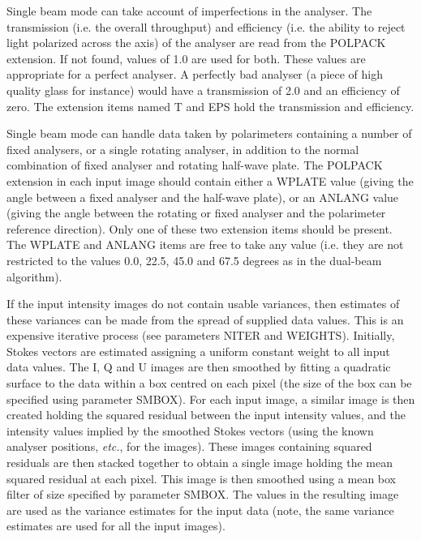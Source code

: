 \documentclass[twoside,11pt]{article}
\renewcommand{\_}{\texttt{\symbol{95}}}
\begin{document}
{{      Single beam mode can take account of imperfections in the analyser.
      The transmission (i.e. the overall throughput) and efficiency
      (i.e. the ability to reject light polarized across the axis) of the
      analyser are read from the POLPACK extension. If not found, values
      of 1.0 are used for both. These values are appropriate for a
      perfect analyser. A perfectly bad analyser (a piece of high quality
      glass for instance) would have a transmission of 2.0 and an
      efficiency of zero. The extension items named T and EPS hold the
      transmission and efficiency.

      Single beam mode can handle data taken by polarimeters containing
      a number of fixed analysers, or a single rotating analyser, in
      addition to the normal combination of fixed analyser and rotating
      half-wave plate. The POLPACK extension in each input image should
      contain either a WPLATE value (giving the angle between a fixed
      analyser and the half-wave plate), or an ANLANG value (giving the
      angle between the rotating or fixed analyser and the polarimeter
      reference direction). Only one of these two extension items
      should be present. The WPLATE and ANLANG items are free to take
      any value (i.e. they are not restricted to the values 0.0, 22.5,
      45.0 and 67.5 degrees as in the dual-beam algorithm).

      If the input intensity images do not contain usable variances,
      then estimates of these variances can be made from the spread of
      supplied data values. This is an expensive iterative process
      (see parameters NITER and WEIGHTS). Initially, Stokes vectors
      are estimated assigning a uniform constant weight to all input
      data values. The I, Q and U images are then smoothed by fitting
      a quadratic surface to the data within a box centred on each
      pixel (the size of the box can be specified using parameter
      SMBOX). For each input image, a similar image is then created
      holding the squared residual between the input intensity values,
      and the intensity values implied by the smoothed Stokes vectors
      (using the known analyser positions, \emph{etc.}, for the images). These
      images containing squared residuals are then stacked together
      to obtain a single image holding the mean squared residual at
      each pixel. This image is then smoothed using a mean box filter
      of size specified by parameter SMBOX. The values in the resulting
      image are used as the variance estimates for the input data (note,
      the same variance estimates are used for all the input images).

}}
\end{document}
